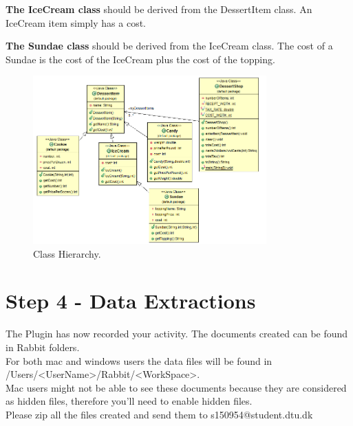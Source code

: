 \textbf{The IceCream class} should be derived from the DessertItem class. An IceCream item simply has a cost.

\textbf{The Sundae class} should be derived from the IceCream class. The cost of a Sundae is the cost of the IceCream plus
the cost of the topping.

	\begin{figure}[!ht]
		\begin{center}
		 	\includegraphics[width=0.8\textwidth]{figures/cti.png}
 
		\end{center}
		\caption{Class Hierarchy.}
		\label{fig:cti}
	\end{figure}

\section{Step 4 - Data Extractions}
The Plugin has now recorded your activity. The documents created can be found in Rabbit folders. \\ For both mac and windows users the data files will be found in /Users/<UserName>/Rabbit/<WorkSpace>.\\ 
Mac users might not be able to see these documents because they are considered as hidden files, therefore you'll need to enable hidden files.\\ 
Please zip all the files created and send them to s150954@student.dtu.dk

